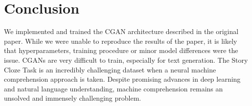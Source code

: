 \documentclass{article}
\begin{document}
\section{Conclusion}
We implemented and trained the CGAN architecture described in the original paper. While we were unable to reproduce the results of the paper, it is likely that hyperparameters, training procedure or minor model differences were the issue. CGANs are very difficult to train, especially for text generation. The Story Cloze Task is an incredibly challenging dataset when a  neural machine comprehension approach is taken. Despite promising advances in deep learning and natural language understanding, machine comprehension remains an unsolved and immensely challenging problem.


\end{document}
